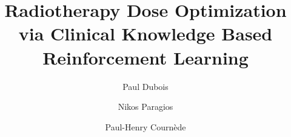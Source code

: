 \documentclass[11pt,twocolumn,twoside]{article}
\begin{document}
\title{Radiotherapy Dose Optimization via Clinical Knowledge Based Reinforcement Learning}

\author[1,2,3]{Paul Dubois}
\author[1]{Nikos Paragios}
\author[2]{Paul-Henry Cournède}




\maketitle
\thispagestyle{fancy}





\begin{customabstract}
	
\end{customabstract}







 
\end{document}
